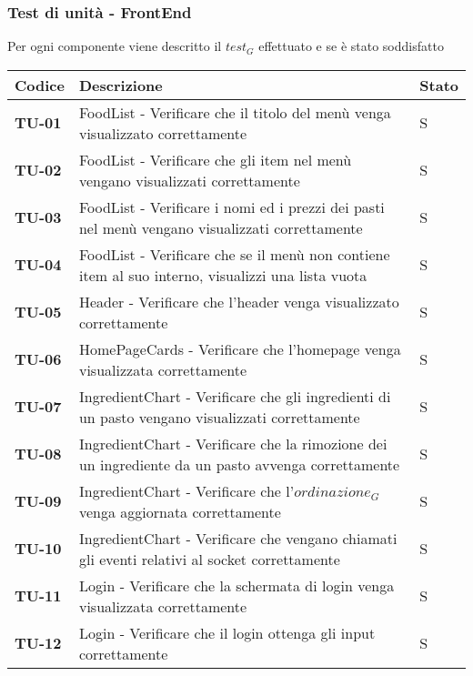\subsubsection{Test di unità - FrontEnd}
Per ogni componente viene descritto il $\textit{test}_G$ effettuato e se è stato soddisfatto
\begin{longtable}{|>{\centering\arraybackslash}p{1.5cm}|p{15cm}|p{1cm}|}
  \hline
  \rowcolor{gray!30}
  \textbf{Codice} & \textbf{Descrizione} & \textbf{Stato} \\
  \hline
  \rowcolor{gray!10}
  \textbf{TU-01} & FoodList - Verificare che il titolo del menù venga visualizzato correttamente  & S \\
  \hline
  \rowcolor{gray!10}
  \textbf{TU-02} & FoodList - Verificare che gli item nel menù vengano visualizzati correttamente  & S \\
  \hline
  \rowcolor{gray!10}
  \textbf{TU-03} & FoodList - Verificare i nomi ed i prezzi dei pasti nel menù vengano visualizzati correttamente & S \\
  \hline
  \rowcolor{gray!10}
  \textbf{TU-04} & FoodList - Verificare che se il menù non contiene item al suo interno, visualizzi una lista vuota  & S \\
  \hline
  \rowcolor{gray!10}
  \textbf{TU-05} & Header - Verificare che l'header venga visualizzato correttamente  & S \\
  \hline
  \rowcolor{gray!10}
  \textbf{TU-06} & HomePageCards - Verificare che l'homepage venga visualizzata correttamente  & S \\
  \hline
  \rowcolor{gray!10}
  \textbf{TU-07} & IngredientChart - Verificare che gli ingredienti di un pasto vengano visualizzati correttamente  & S \\
  \hline
  \rowcolor{gray!10}
  \textbf{TU-08} & IngredientChart - Verificare che la rimozione dei un ingrediente da un pasto avvenga correttamente  & S \\
  \hline
  \rowcolor{gray!10}
  \textbf{TU-09} & IngredientChart - Verificare che l'$\textit{ordinazione}_G$ venga aggiornata correttamente  & S \\
  \hline
  \rowcolor{gray!10}
  \textbf{TU-10} & IngredientChart - Verificare che vengano chiamati gli eventi relativi al socket correttamente  & S \\
  \hline
  \rowcolor{gray!10}
  \textbf{TU-11} & Login - Verificare che la schermata di login venga visualizzata correttamente  & S \\
  \hline
  \rowcolor{gray!10}
  \textbf{TU-12} & Login - Verificare che il login ottenga gli input correttamente  & S \\

\end{longtable}
